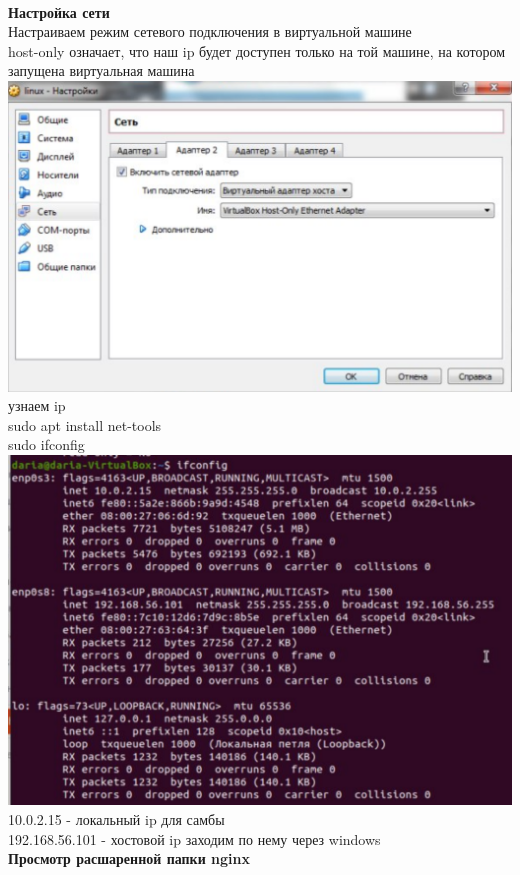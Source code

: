 \documentclass[12pt,a4paper]{scrartcl}
\begin{document}
\\[5pt]
\textbf{Настройка сети}
\\[5pt]
Настраиваем режим сетевого подключения в виртуальной машине
\\[5pt]
host-only означает, что наш ip будет доступен только на той машине, на котором запущена виртуальная машина
\\[5pt]
\includegraphics[scale=10, width=15cm]{f3}
\\[5pt]
узнаем ip
\\[5pt]
sudo apt install net-tools
\\[5pt]
sudo ifconfig
\\[5pt]
\includegraphics[scale=10, width=15cm]{f4}
\\[5pt]
10.0.2.15 - локальный ip для самбы
\\[5pt]
192.168.56.101 - хостовой ip заходим по нему через windows
\\[5pt]
\textbf{Просмотр расшаренной папки nginx}
\end{document}
